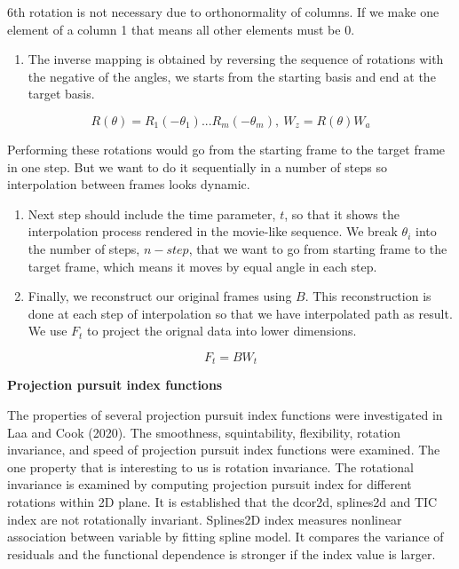 6th rotation is not necessary due to orthonormality of columns. If we make one element of a column 1 that means all other elements must be 0.

\begin{enumerate}
\def\labelenumi{\arabic{enumi}.}
\setcounter{enumi}{3}
\tightlist
\item
  The inverse mapping is obtained by reversing the sequence of rotations with the negative of the angles, we starts from the starting basis and end at the target basis.
\end{enumerate}

\[R(\theta) = R_1(-\theta_1) ... R_m(-\theta_m), \    W_z = R(\theta)W_a\]

Performing these rotations would go from the starting frame to the target frame in one step. But we want to do it sequentially in a number of steps so interpolation between frames looks dynamic.

\begin{enumerate}
\def\labelenumi{\arabic{enumi}.}
\setcounter{enumi}{4}
\item
  Next step should include the time parameter, \(t\), so that it shows the interpolation process rendered in the movie-like sequence. We break \(\theta_i\) into the number of steps, \(n-step\), that we want to go from starting frame to the target frame, which means it moves by equal angle in each step.
\item
  Finally, we reconstruct our original frames using \(B\). This reconstruction is done at each step of interpolation so that we have interpolated path as result. We use \(F_t\) to project the orignal data into lower dimensions.
\end{enumerate}

\[F_t = B  W_t\]

\textbf{Projection pursuit index functions}

The properties of several projection pursuit index functions were investigated in Laa and Cook (2020). The smoothness, squintability, flexibility, rotation invariance, and speed of projection pursuit index functions were examined. The one property that is interesting to us is rotation invariance. The rotational invariance is examined by computing projection pursuit index for different rotations within 2D plane. It is established that the dcor2d, splines2d and TIC index are not rotationally invariant. Splines2D index measures nonlinear association between variable by fitting spline model. It compares the variance of residuals and the functional dependence is stronger if the index value is larger.

